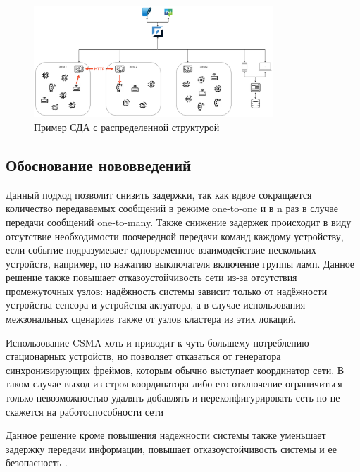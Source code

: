 \documentclass[a4paper,12pt]{article}
\begin{document}
\begin{figure}[h]
    \centering
    \includegraphics[width=0.8\textwidth]{images/GlobalSystemDesing.png}
    \caption{Пример СДА с распределенной структурой}
    \label{fig:GlobalSystemDesing}
\end{figure}

\subsection{Обоснование нововведений}

Данный подход позволит снизить задержки, так как вдвое сокращается количество передаваемых сообщений в режиме one-to-one и в n раз в случае передачи сообщений one-to-many. Также
снижение задержек происходит в виду отсутствие необходимости поочередной передачи команд каждому устройству, если событие подразумевает одновременное взаимодействие нескольких
устройств, например, по нажатию выключателя включение группы ламп. Данное решение также повышает отказоустойчивость сети из-за отсутствия промежуточных узлов: надёжность системы
зависит только от надёжности устройства-сенсора и устройства-актуатора, а в случае использования межзональных сценариев также от узлов кластера из этих локаций.

Использование CSMA хоть и приводит к чуть большему потреблению стационарных устройств, но позволяет отказаться от генератора синхронизирующих фреймов, которым обычно выступает
координатор сети. В таком случае выход из строя координатора либо его отключение ограничиться только невозможностью удалять добавлять и переконфигурировать сеть но не скажется на работоспособности сети

Данное решение кроме повышения надежности системы также уменьшает задержку передачи информации, повышает отказоустойчивость системы и ее безопасность \cite{SecuritySmartHome, SecuritySmartHome2}.
\end{document}
